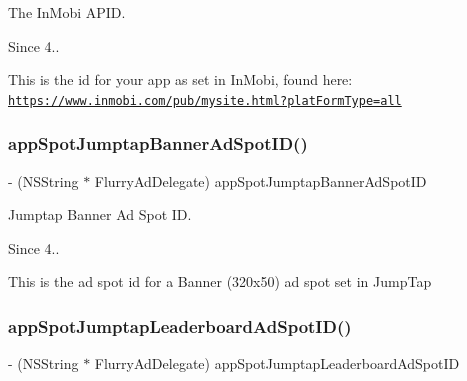 The In\+Mobi A\+P\+ID. 

\begin{DoxySince}{Since}
4..
\end{DoxySince}
This is the id for your app as set in In\+Mobi, found here\+: \href{https://www.inmobi.com/pub/mysite.html?platFormType=all}{\tt https\+://www.\+inmobi.\+com/pub/mysite.\+html?plat\+Form\+Type=all} \mbox{\label{protocolFlurryAdDelegate_01-p_a45802f6353c98d52e470dec6bc5ea9cb}} 
\subsubsection{\texorpdfstring{app\+Spot\+Jumptap\+Banner\+Ad\+Spot\+I\+D()}{appSpotJumptapBannerAdSpotID()}}
{\footnotesize\ttfamily -\/ (N\+S\+String $\ast$ Flurry\+Ad\+Delegate) app\+Spot\+Jumptap\+Banner\+Ad\+Spot\+ID \begin{DoxyParamCaption}{ }\end{DoxyParamCaption}}



Jumptap Banner Ad Spot ID. 

\begin{DoxySince}{Since}
4..
\end{DoxySince}
This is the ad spot id for a Banner (320x50) ad spot set in Jump\+Tap \mbox{\label{protocolFlurryAdDelegate_01-p_a50616f32d54066bfee17998faa126218}} 
\subsubsection{\texorpdfstring{app\+Spot\+Jumptap\+Leaderboard\+Ad\+Spot\+I\+D()}{appSpotJumptapLeaderboardAdSpotID()}}
{\footnotesize\ttfamily -\/ (N\+S\+String $\ast$ Flurry\+Ad\+Delegate) app\+Spot\+Jumptap\+Leaderboard\+Ad\+Spot\+ID \begin{DoxyParamCaption}{ }\end{DoxyParamCaption}}



